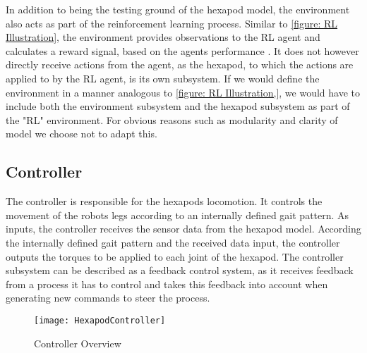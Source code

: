 In addition to being the testing ground of the hexapod model, the environment also acts as part of the reinforcement learning process.
Similar to \ref{figure: RL Illustration}, the environment provides observations to the RL agent and calculates a reward signal, based on the agents performance .
It does not however directly receive actions from the agent, as the hexapod, to which the actions are applied to by the RL agent, is its own subsystem.
If we would define the environment in a manner analogous to \ref{figure: RL Illustration,}, we would have to include both the environment subsystem and the hexapod subsystem as part of the "RL" environment.
For obvious reasons such as modularity and clarity of model we choose not to adapt this.

\subsection{Controller}
The controller is responsible for the hexapods locomotion.
It controls the movement of the robots legs according to an internally defined gait pattern.
As inputs, the controller receives the sensor data from the hexapod model.
According the internally defined gait pattern and the received data input, the controller outputs the torques to be applied to each joint of the hexapod.
The controller subsystem can be described as a feedback control system, as it receives feedback from a process it has to control and takes this feedback into account when generating new commands to steer the process.

\begin{figure}
	\centerline{\texttt{[image: HexapodController]}}
	\caption{Controller Overview}
	\label{figure: Controller Overview}
\end{figure}

